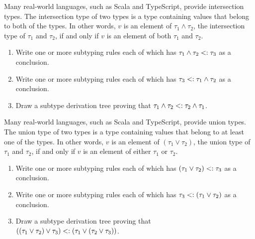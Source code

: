 \begin{exercise}

Many real-world languages, such as Scala and TypeScript, provide
intersection types. The intersection type of two types is a type containing values that
belong to both of the types. In other words, $v$ is an element of
$\tau_1\land\tau_2$, the intersection type of $\tau_1$ and $\tau_2$, if and only
if $v$ is an element of both $\tau_1$ and $\tau_2$.

\begin{enumerate}
  \item Write one or more subtyping rules each of which has
    $\tau_1\land\tau_2<:\tau_3$ as a conclusion.
  \item Write one or more subtyping rules each of which has
    $\tau_3<:\tau_1\land\tau_2$ as a conclusion.
  \item Draw a subtype derivation tree proving that
    $\tau_1\land\tau_2<:\tau_2\land\tau_1$.
\end{enumerate}

\end{exercise}

\begin{exercise}

Many real-world languages, such as Scala and TypeScript, provide
union types. The union type of two types is a type containing values that
belong to at least one of the types. In other words, $v$ is an element of
$(\tau_1\lor\tau_2)$, the union type of $\tau_1$ and $\tau_2$, if and only
if $v$ is an element of either $\tau_1$ or $\tau_2$.

\begin{enumerate}
  \item Write one or more subtyping rules each of which has
    $(\tau_1\lor\tau_2)<:\tau_3$ as a conclusion.
  \item Write one or more subtyping rules each of which has
    $\tau_3<:(\tau_1\lor\tau_2)$ as a conclusion.
  \item Draw a subtype derivation tree proving that
    $((\tau_1\lor\tau_2)\lor\tau_3)<:(\tau_1\lor(\tau_2\lor\tau_3))$.
\end{enumerate}

\end{exercise}

